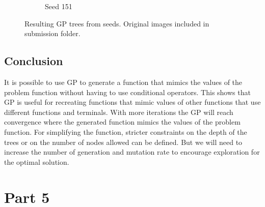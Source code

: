 \documentclass{article}
\begin{document}
\begin{figure}[h!]
\begin{subfigure}[b]{0.49\linewidth}
		\caption{Seed 151}
	\end{subfigure}
	\caption{Resulting GP trees from seeds. Original images included in submission folder.}
\end{figure}
\subsection*{Conclusion}
It is possible to use GP to generate a function that mimics the values of the problem function without having to use conditional operators. This shows that GP is useful for recreating functions that mimic values of other functions that use different functions and terminals. With more iterations the GP will reach convergence where the generated function mimics the values of the problem function. For simplifying the function, stricter constraints on the depth of the trees or on the number of nodes allowed can be defined. But we will need to increase the number of generation and mutation rate to encourage exploration for the optimal solution. 
\section*{Part 5}
\end{document}
